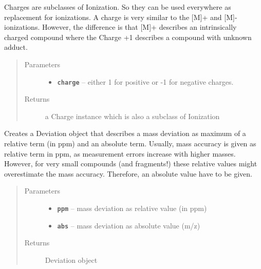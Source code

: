 \documentclass[letterpaper,10pt,openany,oneside]{sphinxmanual}
\begin{document}

\begin{fulllineitems}
\label{library:de.unijena.bioinf.sirius.getCharge(int)}
Charges are subclasses of Ionization. So they can be used everywhere as replacement for ionizations. A charge is very similar to the {[}M{]}+ and {[}M{]}- ionizations. However, the difference is that {[}M{]}+ describes an intrinsically charged compound where the Charge +1 describes a compound with unknown adduct.
\begin{quote}\begin{description}
\item[{Parameters}] \leavevmode\begin{itemize}
\item {} 
\textbf{\texttt{charge}} -- either 1 for positive or -1 for negative charges.

\end{itemize}

\item[{Returns}] \leavevmode
a Charge instance which is also a subclass of Ionization

\end{description}\end{quote}

\end{fulllineitems}


\begin{fulllineitems}
\label{library:de.unijena.bioinf.sirius.getMassDeviation(int, double)}
Creates a Deviation object that describes a mass deviation as maximum of a relative term (in ppm) and an absolute term. Usually, mass accuracy is given as relative term in ppm, as measurement errors increase with higher masses. However, for very small compounds (and fragments!) these relative values might overestimate the mass accuracy. Therefore, an absolute value have to be given.
\begin{quote}\begin{description}
\item[{Parameters}] \leavevmode\begin{itemize}
\item {} 
\textbf{\texttt{ppm}} -- mass deviation as relative value (in ppm)

\item {} 
\textbf{\texttt{abs}} -- mass deviation as absolute value (m/z)

\end{itemize}

\item[{Returns}] \leavevmode
Deviation object

\end{description}\end{quote}

\end{fulllineitems}
\end{document}
